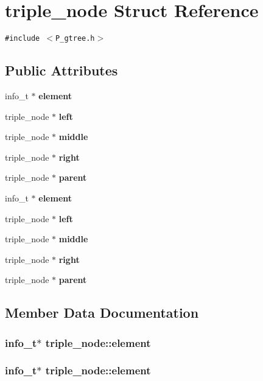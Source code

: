 \section{triple\_\-node  Struct Reference}
\label{structtriple__node}
{\tt \#include $<$P\_\-gtree.h$>$}

\subsection*{Public Attributes}
\begin{CompactItemize}
\item 
info\_\-t $\ast$ {\bf element}
\item 
triple\_\-node $\ast$ {\bf left}
\item 
triple\_\-node $\ast$ {\bf middle}
\item 
triple\_\-node $\ast$ {\bf right}
\item 
triple\_\-node $\ast$ {\bf parent}
\item 
info\_\-t $\ast$ {\bf element}
\item 
triple\_\-node $\ast$ {\bf left}
\item 
triple\_\-node $\ast$ {\bf middle}
\item 
triple\_\-node $\ast$ {\bf right}
\item 
triple\_\-node $\ast$ {\bf parent}
\end{CompactItemize}


\subsection{Member Data Documentation}
\subsubsection{\setlength{\rightskip}{0pt plus 5cm}info\_\-t$\ast$ triple\_\-node::element}\label{structtriple__node_m5}


\subsubsection{\setlength{\rightskip}{0pt plus 5cm}info\_\-t$\ast$ triple\_\-node::element}\label{structtriple__node_m0}


